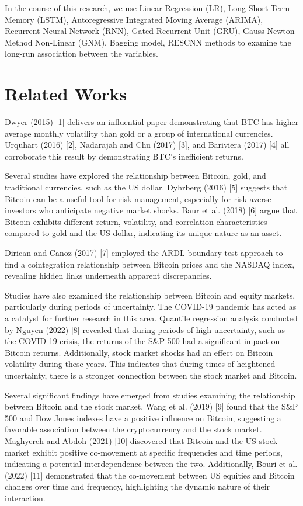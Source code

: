 \documentclass{ieeeojies}
\begin{document}
In the course of this research, we use  Linear Regression (LR), Long Short-Term Memory (LSTM), Autoregressive Integrated Moving Average (ARIMA), Recurrent Neural Network (RNN), Gated Recurrent Unit (GRU), Gauss Newton Method Non-Linear (GNM), Bagging model, RESCNN methods to examine the long-run association between the variables.

\section{Related Works}
Dwyer (2015) [1] delivers an influential paper demonstrating that BTC has higher average monthly volatility than gold or a group of international currencies. Urquhart (2016) [2], Nadarajah and Chu (2017) [3], and Bariviera (2017) [4] all corroborate this result by demonstrating BTC’s inefficient returns. 

Several studies have explored the relationship between Bitcoin, gold, and traditional currencies, such as the US dollar. Dyhrberg (2016) [5] suggests that Bitcoin can be a useful tool for risk management, especially for risk-averse investors who anticipate negative market shocks. Baur et al. (2018) [6] argue that Bitcoin exhibits different return, volatility, and correlation characteristics compared to gold and the US dollar, indicating its unique nature as an asset.

Dirican and Canoz (2017) [7] employed the ARDL boundary test approach to find a cointegration relationship between Bitcoin prices and the NASDAQ index, revealing hidden links underneath apparent discrepancies.

Studies have also examined the relationship between Bitcoin and equity markets, particularly during periods of uncertainty. The COVID-19 pandemic has acted as a catalyst for further research in this area. Quantile regression analysis conducted by Nguyen (2022) [8] revealed that during periods of high uncertainty, such as the COVID-19 crisis, the returns of the S\&P 500 had a significant impact on Bitcoin returns. Additionally, stock market shocks had an effect on Bitcoin volatility during these years. This indicates that during times of heightened uncertainty, there is a stronger connection between the stock market and Bitcoin.

Several significant findings have emerged from studies examining the relationship between Bitcoin and the stock market. Wang et al. (2019) [9] found that the S\&P 500 and Dow Jones indexes have a positive influence on Bitcoin, suggesting a favorable association between the cryptocurrency and the stock market. Maghyereh and Abdoh (2021) [10] discovered that Bitcoin and the US stock market exhibit positive co-movement at specific frequencies and time periods, indicating a potential interdependence between the two. Additionally, Bouri et al. (2022) [11] demonstrated that the co-movement between US equities and Bitcoin changes over time and frequency, highlighting the dynamic nature of their interaction.
\end{document}
